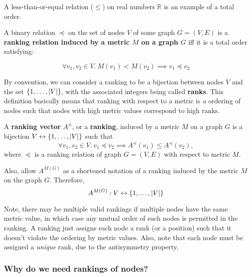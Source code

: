 A less-than-or-equal relation ($\leq$) on real numbers $\mathbb{R}$ is an example of a total order.

\begin{definition}
    A binary relation $\preceq$ on the set of nodes $V$ of some graph $G = (V, E)$ is a \textbf{ranking relation induced by a metric $M$ on a graph $G$} iff it is a total order satisfying:

    \[ \forall v_1, v_2 \in V.\ M(v_1) < M(v_2) \implies v_1 \preceq v_2 \]
\end{definition}

By convention, we can consider a ranking to be a bijection between nodes $V$ and the set $\left\{1, \dots, \left\lvert V \right\rvert\right\}$, with the associated integers being called \textbf{ranks}.
This definition basically means that ranking with respect to a metric is \textsl{a} ordering of nodes such that nodes with high metric values correspond to high ranks.

\begin{definition}
    A \textbf{ranking vector} $A^{\preceq}$, or a \textbf{ranking}, induced by a metric $M$ on a graph $G$ is a bijection $V \leftrightarrow \left\{1, \dots, \left\lvert V \right\rvert\right\}$ such that
    \[ \forall v_1, v_2 \in V.\ v_1 \preceq v_2 \implies A^{\preceq}(v_1) \leq A^{\preceq}(v_2), \]
    where $\preceq$ is a ranking relation of graph $G = (V, E)$ with respect to metric $M$.

    Also, allow $A^{M(G)}$ as a shortened notation of a ranking induced by the metric $M$ on the graph $G$.
    Therefore,
    \[ A^{M(G)} : V \leftrightarrow \left\{1, \dots, \left\lvert V \right\rvert\right\} \]
\end{definition}

Note, there may be multiple valid rankings if multiple nodes have the same metric value, in which case any mutual order of such nodes is permitted in the ranking.
A ranking just assigns each node a rank (or a position) such that it doesn't violate the ordering by metric values.
Also, note that each node must be assigned a \textsl{unique} rank, due to the antisymmetry property.



\subsubsection*{Why do we need rankings of nodes?}

